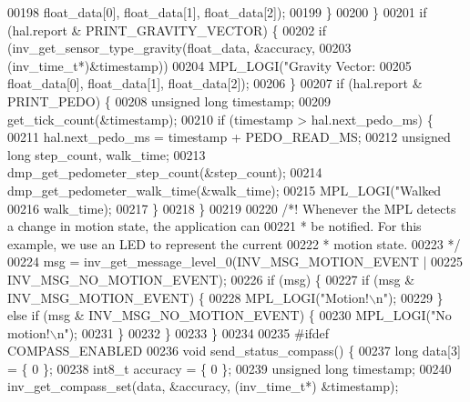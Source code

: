 \begin{DoxyCode}
{00198                     float\_data[0], float\_data[1], float\_data[2]);
00199          \}
00200     \}
00201     \textcolor{keywordflow}{if} (hal.report & PRINT_GRAVITY_VECTOR) \{
00202             \textcolor{keywordflow}{if} (inv\_get\_sensor\_type\_gravity(float\_data, &accuracy,
00203                 (inv\_time\_t*)&timestamp))
00204                 MPL\_LOGI(\textcolor{stringliteral}{"Gravity Vector: %
00205                         float\_data[0], float\_data[1], float\_data[2]);
00206     \}
00207     \textcolor{keywordflow}{if} (hal.report & PRINT_PEDO) \{
00208         \textcolor{keywordtype}{unsigned} \textcolor{keywordtype}{long} timestamp;
00209         get_tick_count(&timestamp);
00210         \textcolor{keywordflow}{if} (timestamp > hal.next_pedo_ms) \{
00211             hal.next_pedo_ms = timestamp + PEDO_READ_MS;
00212             \textcolor{keywordtype}{unsigned} \textcolor{keywordtype}{long} step\_count, walk\_time;
00213             dmp\_get\_pedometer\_step\_count(&step\_count);
00214             dmp\_get\_pedometer\_walk\_time(&walk\_time);
00215             MPL\_LOGI(\textcolor{stringliteral}{"Walked %
00216             walk\_time);
00217         \}
00218     \}
00219 
00220     \textcolor{comment}{/*! Whenever the MPL detects a change in motion state, the application can}
00221 \textcolor{comment}{     * be notified. For this example, we use an LED to represent the current}
00222 \textcolor{comment}{     * motion state.}
00223 \textcolor{comment}{     */}
00224     msg = inv\_get\_message\_level\_0(INV\_MSG\_MOTION\_EVENT |
00225             INV\_MSG\_NO\_MOTION\_EVENT);
00226     \textcolor{keywordflow}{if} (msg) \{
00227         \textcolor{keywordflow}{if} (msg & INV\_MSG\_MOTION\_EVENT) \{
00228             MPL\_LOGI(\textcolor{stringliteral}{"Motion!\(\backslash\)n"});
00229         \} \textcolor{keywordflow}{else} \textcolor{keywordflow}{if} (msg & INV\_MSG\_NO\_MOTION\_EVENT) \{
00230             MPL\_LOGI(\textcolor{stringliteral}{"No motion!\(\backslash\)n"});
00231         \}
00232     \}
00233 \}
00234 
00235 \textcolor{preprocessor}{#}\textcolor{preprocessor}{ifdef} \textcolor{preprocessor}{COMPASS\_ENABLED}
00236 \textcolor{keywordtype}{void} send\_status\_compass() \{
00237     \textcolor{keywordtype}{long} data[3] = \{ 0 \};
00238     int8\_t accuracy = \{ 0 \};
00239     \textcolor{keywordtype}{unsigned} \textcolor{keywordtype}{long} timestamp;
00240     inv\_get\_compass\_set(data, &accuracy, (inv\_time\_t*) &timestamp);
}}}
\end{DoxyCode}
